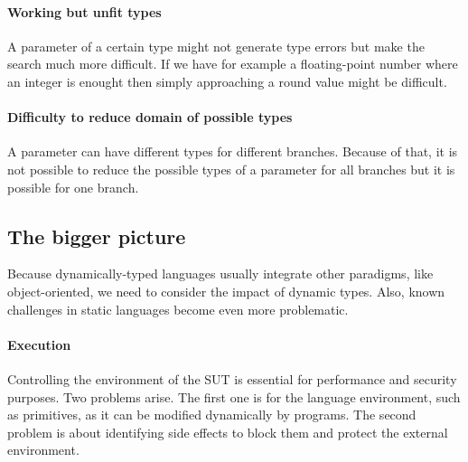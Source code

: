 \documentclass{llncs2e/llncs}
\begin{document}
\paragraph{Working but unfit types} A parameter of a certain type might not
generate type errors but make the search much more difficult. If we have for
example a floating-point number where an integer is enought then simply
approaching a round value might be difficult.


\paragraph{Difficulty to reduce domain of possible types} A parameter can have
different types for different branches. Because of that, it is not possible to
reduce the possible types of a parameter for all branches but it is possible
for one branch.

\subsection{The bigger picture}
Because dynamically-typed languages usually integrate other paradigms, like
object-oriented, we need to consider the impact of dynamic types. Also, known
challenges in static languages become even more problematic.
\paragraph{Execution} Controlling the environment of the SUT is essential for
performance and security purposes. Two problems arise. The first one is for the
language environment, such as primitives, as it can be modified dynamically by
programs. The second problem is about identifying side effects to block them and
protect the external environment.
\end{document}

